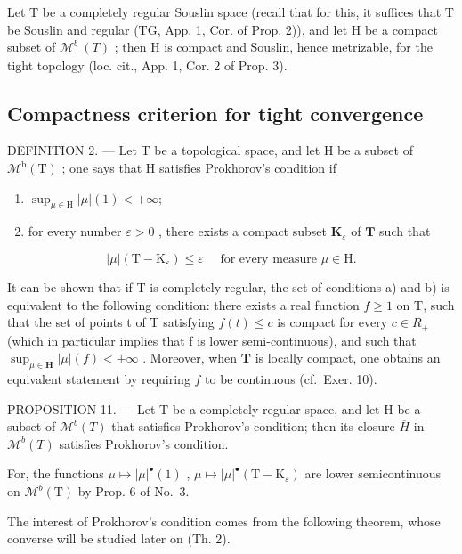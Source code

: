 Let T be a completely regular Souslin space (recall that for this, it suffices that T be Souslin and regular (TG, App. 1, Cor. of Prop. 2)), and let H be a compact subset of \(\mathcal{M}_{+}^{b}(T)\) ; then H is compact and Souslin, hence metrizable, for the tight topology (loc. cit., App. 1, Cor. 2 of Prop. 3).

\subsection{Compactness criterion for tight convergence}

DEFINITION 2. --- Let T be a topological space, and let H be a subset of \(\mathcal{M}^{\mathrm{b}}(\mathrm{T})\) ; one says that H satisfies Prokhorov's condition if

\begin{enumerate}
\def\labelenumi{\alph{enumi})}
\item
  \(\sup_{\mu \in \mathrm{H}}|\mu |(1) < +\infty ;\)
\item
  for every number \(\varepsilon > 0\) , there exists a compact subset \(\mathbf{K}_{\varepsilon}\) of \(\mathbf{T}\) such that
\end{enumerate}

\[
| \mu | (\mathrm{T} - \mathrm{K} _ {\varepsilon}) \leqslant \varepsilon \quad \text { for every measure } \mu \in \mathrm{H}.\tag{6}
\]

It can be shown that if T is completely regular, the set of conditions a) and b) is equivalent to the following condition: there exists a real function \(f \geqslant 1\) on T, such that the set of points t of T satisfying \(f(t) \leqslant c\) is compact for every \(c \in R_{+}\) (which in particular implies that f is lower semi-continuous), and such that \(\sup_{\mu \in \mathbf{H}} |\mu|(f) < +\infty\) . Moreover, when \(\mathbf{T}\) is locally compact, one obtains an equivalent statement by requiring \(f\) to be continuous (cf.~Exer. 10).

PROPOSITION 11. --- Let T be a completely regular space, and let H be a subset of \(\mathcal{M}^{b}(T)\) that satisfies Prokhorov's condition; then its closure \(\overline{H}\) in \(\mathcal{M}^{b}(T)\) satisfies Prokhorov's condition.

For, the functions \(\mu \mapsto |\mu|^{\bullet}(1)\) , \(\mu \mapsto |\mu|^{\bullet}(\mathrm{T} - \mathrm{K}_{\varepsilon})\) are lower semicontinuous on \(\mathcal{M}^b (\mathrm{T})\) by Prop. 6 of No.~3.

The interest of Prokhorov's condition comes from the following theorem, whose converse will be studied later on (Th. 2).

